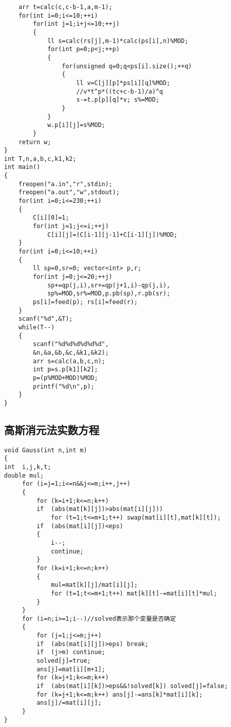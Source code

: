 \documentclass{article}
\begin{document}
\begin{CJK*}{UTF8}{song}
\begin{lstlisting}
    arr t=calc(c,c-b-1,a,m-1);
    for(int i=0;i<=10;++i)
        for(int j=1;i+j<=10;++j)
        {
            ll s=calc(rs[j],m-1)*calc(ps[i],n)%MOD;
            for(int p=0;p<j;++p)
            {
                for(unsigned q=0;q<ps[i].size();++q)
                {
                    ll v=C[j][p]*ps[i][q]%MOD;
                    //v*t^p*((tc+c-b-1)/a)^q
                    s-=t.p[p][q]*v; s%=MOD;
                }
            }
            w.p[i][j]=s%MOD;
        }
    return w;
}
int T,n,a,b,c,k1,k2;
int main()
{
    freopen("a.in","r",stdin);
    freopen("a.out","w",stdout);
    for(int i=0;i<=230;++i)
    {
        C[i][0]=1;
        for(int j=1;j<=i;++j)
            C[i][j]=(C[i-1][j-1]+C[i-1][j])%MOD;
    }
    for(int i=0;i<=10;++i)
    {
        ll sp=0,sr=0; vector<int> p,r;
        for(int j=0;j<=20;++j)
            sp+=qp(j,i),sr+=qp(j+1,i)-qp(j,i),
            sp%=MOD,sr%=MOD,p.pb(sp),r.pb(sr);
        ps[i]=feed(p); rs[i]=feed(r);
    }
    scanf("%d",&T);
    while(T--)
    {
        scanf("%d%d%d%d%d%d",
        &n,&a,&b,&c,&k1,&k2);
        arr s=calc(a,b,c,n);
        int p=s.p[k1][k2];
        p=(p%MOD+MOD)%MOD;
        printf("%d\n",p);
    }
}
\end{lstlisting}
\subsection{高斯消元法实数方程}
\begin{lstlisting}
void Gauss(int n,int m)
{
int  i,j,k,t;
double mul;
     for (i=j=1;i<=n&&j<=m;i++,j++)
     {
         for (k=i+1;k<=n;k++)
         if  (abs(mat[k][j])>abs(mat[i][j]))
             for (t=1;t<=m+1;t++) swap(mat[i][t],mat[k][t]);
         if  (abs(mat[i][j])<eps)
         {
             i--;
             continue;
         }
         for (k=i+1;k<=n;k++)
         {
             mul=mat[k][j]/mat[i][j];
             for (t=1;t<=m+1;t++) mat[k][t]-=mat[i][t]*mul;
         }
     }
     for (i=n;i>=1;i--)//solved表示那个变量是否确定
     {
         for (j=1;j<=m;j++)
         if  (abs(mat[i][j])>eps) break;
         if  (j>m) continue;
         solved[j]=true;
         ans[j]=mat[i][m+1];
         for (k=j+1;k<=m;k++)
         if  (abs(mat[i][k])>eps&&!solved[k]) solved[j]=false;
         for (k=j+1;k<=m;k++) ans[j]-=ans[k]*mat[i][k];
         ans[j]/=mat[i][j];
     }
}
\end{lstlisting}

\end{CJK*}
\end{document}
